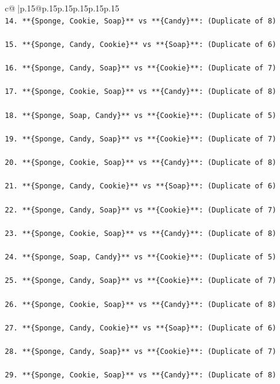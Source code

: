 \documentclass{article}
\begin{document}
{\begin{supertabular}{c@{$\;$}|p{.15\linewidth}@{}p{.15\linewidth}p{.15\linewidth}p{.15\linewidth}p{.15\linewidth}p{.15\linewidth}}
{{{\\ 
\texttt{14. **\{Sponge, Cookie, Soap\}** vs **\{Candy\}**: (Duplicate of 8)} \\
\\ 
\texttt{15. **\{Sponge, Candy, Cookie\}** vs **\{Soap\}**: (Duplicate of 6)} \\
\\ 
\texttt{16. **\{Sponge, Candy, Soap\}** vs **\{Cookie\}**: (Duplicate of 7)} \\
\\ 
\texttt{17. **\{Sponge, Cookie, Soap\}** vs **\{Candy\}**: (Duplicate of 8)} \\
\\ 
\texttt{18. **\{Sponge, Soap, Candy\}** vs **\{Cookie\}**: (Duplicate of 5)} \\
\\ 
\texttt{19. **\{Sponge, Candy, Soap\}** vs **\{Cookie\}**: (Duplicate of 7)} \\
\\ 
\texttt{20. **\{Sponge, Cookie, Soap\}** vs **\{Candy\}**: (Duplicate of 8)} \\
\\ 
\texttt{21. **\{Sponge, Candy, Cookie\}** vs **\{Soap\}**: (Duplicate of 6)} \\
\\ 
\texttt{22. **\{Sponge, Candy, Soap\}** vs **\{Cookie\}**: (Duplicate of 7)} \\
\\ 
\texttt{23. **\{Sponge, Cookie, Soap\}** vs **\{Candy\}**: (Duplicate of 8)} \\
\\ 
\texttt{24. **\{Sponge, Soap, Candy\}** vs **\{Cookie\}**: (Duplicate of 5)} \\
\\ 
\texttt{25. **\{Sponge, Candy, Soap\}** vs **\{Cookie\}**: (Duplicate of 7)} \\
\\ 
\texttt{26. **\{Sponge, Cookie, Soap\}** vs **\{Candy\}**: (Duplicate of 8)} \\
\\ 
\texttt{27. **\{Sponge, Candy, Cookie\}** vs **\{Soap\}**: (Duplicate of 6)} \\
\\ 
\texttt{28. **\{Sponge, Candy, Soap\}** vs **\{Cookie\}**: (Duplicate of 7)} \\
\\ 
\texttt{29. **\{Sponge, Cookie, Soap\}** vs **\{Candy\}**: (Duplicate of 8)} \\
}}}
\end{supertabular}}
\end{document}
